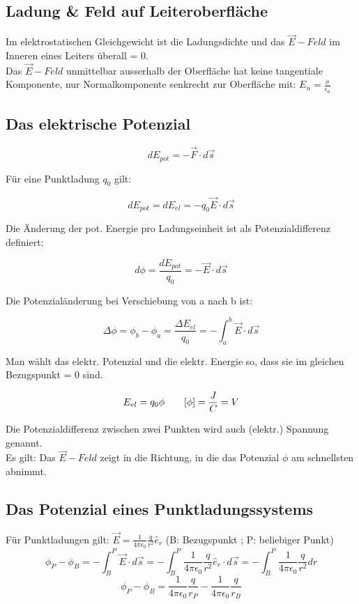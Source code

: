\subsection{Ladung \& Feld auf Leiteroberfläche}
Im elektrostatischen Gleichgewicht ist die Ladungsdichte und das $\Vec{E}-Feld$ im Inneren eines Leiters überall = 0. \\
Das $\Vec{E}-Feld$ unmittelbar ausserhalb der Oberfläche hat keine tangentiale Komponente, nur Normalkomponente senkrecht zur Oberfläche mit: $E_n = \frac{\sigma}{\epsilon_0}$

\subsection{Das elektrische Potenzial}

\begin{formulabox}
    \[
    dE_{pot} = -\Vec{F} \cdot d\Vec{s}
    \]
\end{formulabox}
Für eine Punktladung $q_0$ gilt:
\begin{formulabox}
    \[
    dE_{pot} = dE_{el} = -q_0\Vec{E}\cdot d\Vec{s}
    \]
\end{formulabox}
Die Änderung der pot. Energie pro Ladungseinheit ist als Potenzialdifferenz definiert:
\begin{formulabox}
    \[
    d\phi = \frac{dE_{pot}}{q_0} = -\Vec{E} \cdot d\Vec{s}
    \]
\end{formulabox}
Die Potenzialänderung bei Verschiebung von a nach b ist:
\begin{formulabox}
    \[
    \Delta\phi = \phi_b - \phi_a = \frac{\Delta E_{el}}{q_0} = - \int_a^b \Vec{E} \cdot d\Vec{s}
    \]
\end{formulabox}
Man wählt das elektr. Potenzial und die elektr. Energie so, dass sie im gleichen Bezugspunkt = 0 sind.
\begin{formulabox}
    \[
    E_{el} = q_0 \phi \hspace{7mm} [\phi] = \frac{J}{C} = V
    \]
\end{formulabox}
Die Potenzialdifferenz zwischen zwei Punkten wird auch (elektr.) Spannung genannt. \\
Es gilt: Das $\Vec{E}-Feld$ zeigt in die Richtung, in die das Potenzial $\phi$ am schnellsten abnimmt.

\subsection{Das Potenzial eines Punktladungssystems}
Für Punktladungen gilt: $\Vec{E} = \frac{1}{4\pi\epsilon_0} \frac{q}{r^2}\hat{e}_r$ \hspace{6mm} (B: Bezugspunkt ; P: beliebiger Punkt)
\[
    \phi_P - \phi_B = - \int_B^P \Vec{E}\cdot d\Vec{s} = -\int_B^P\frac{1}{4\pi\epsilon_0}\frac{q}{r^2}\hat{e}_r \cdot d\Vec{s} = -\int_B^P\frac{1}{4\pi\epsilon_0}\frac{q}{r^2}dr 
\]
\[
    \phi_P - \phi_B = \frac{1}{4\pi\epsilon_0}\frac{q}{r_P} - \frac{1}{4\pi\epsilon_0}\frac{q}{r_B}
\]
\\

